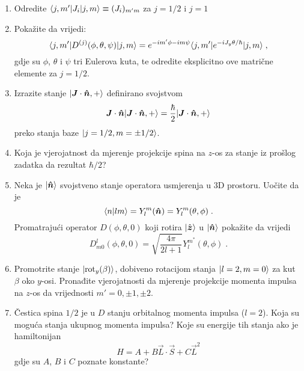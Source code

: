 \begin{enumerate}[label=\arabic{chapter}.\arabic*.]

    \item \label{zad:matj}
Odredite $\langle j, m' |J_{i} | j, m \rangle \equiv (J_i)_{m' m}$ za 
$j=1/2$ i $j=1$

\item
Pokažite da vrijedi: 
\begin{equation}
\langle j, m' | D^{(j)}(\phi, \theta, \psi) | j, m \rangle = e^{-im'\phi-im\psi}
\langle j, m' | e^{-i J_y \theta /\hbar} | j, m \rangle \;,
\end{equation}
gdje su $\phi$, $\theta$ i $\psi$ tri Eulerova kuta,
te odredite eksplicitno ove matrične elemente za $j=1/2$.

\item
Izrazite stanje $\ket{\vec{J}\cdot\unitn, +}$ definirano svojstvom
\begin{displaymath}
    \vec{J}\cdot\unitn \ket{\vec{J}\cdot\unitn, +} =
  \frac{\hbar}{2} \ket{\vec{J}\cdot\unitn, +}
\end{displaymath}
preko stanja baze $| j=1/2, m=\pm 1/2 \rangle$.

\item
Koja je vjerojatnost da mjerenje projekcije spina na $z$-os za stanje iz
prošlog zadatka da rezultat $\hbar/2$?

\item 
Neka je $\ket{\unitn}$ svojstveno stanje operatora usmjerenja u 3D
prostoru. Uočite da je
\begin{displaymath}
     \bra{n}lm\rangle = Y^{m}_l (\unitn) = Y^{m}_l (\theta, \phi) \;.
\end{displaymath}
Promatrajući operator $D(\phi,\theta,0)$ koji rotira $\ket{\hat{\vec{z}}}$
u $\ket{\unitn}$ pokažite da vrijedi
\begin{displaymath}
    D^{l}_{m0}(\phi,\theta,0)=\sqrt{\frac{4\pi}{2l+1}}
 Y^{m^*}_l (\theta, \phi)\;.
\end{displaymath}

\item
Promotrite stanje $| \text{rot}_y(\beta) \rangle$, dobiveno rotacijom stanja
$| l=2, m=0 \rangle$ za kut $\beta$ oko $y$-osi. Pronađite vjerojatnosti da
mjerenje projekcije momenta impulsa na $z$-os da vrijednosti
$m'=0,\pm 1, \pm 2$.

\item Čestica spina $1/2$ je u $D$ stanju orbitalnog momenta impulsa
($l=2$). Koja su moguća stanja ukupnog momenta impulsa? Koje su energije
tih stanja ako je hamiltonijan 
\[ H = A + B \vec{L}\cdot\vec{S} + C \vec{L}^2 \]
gdje su $A$, $B$ i $C$ poznate konstante?


\end{enumerate}
